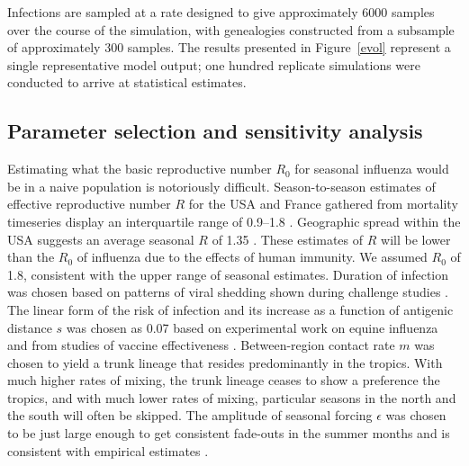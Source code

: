 \documentclass[11pt,oneside,letterpaper]{article}
\begin{document}
Infections are sampled at a rate designed to give approximately 6000 samples over the course of the simulation, with genealogies constructed from a subsample of approximately 300 samples.  The results presented in Figure~\ref{evol} represent a single representative model output; one hundred replicate simulations were conducted to arrive at statistical estimates. 

\subsection*{Parameter selection and sensitivity analysis}

Estimating what the basic reproductive number $R_0$ for seasonal influenza would be in a naive population is notoriously difficult.  Season-to-season estimates of effective reproductive number $R$ for the USA and France gathered from mortality timeseries display an interquartile range of 0.9--1.8 \cite{Chowell08}.  Geographic spread within the USA suggests an average seasonal $R$ of 1.35 \cite{Viboud06}.  These estimates of $R$ will be lower than the $R_0$ of influenza due to the effects of human immunity.  We assumed $R_0$ of 1.8, consistent with the upper range of seasonal estimates.  Duration of infection was chosen based on patterns of viral shedding shown during challenge studies \cite{Carrat08}.  The linear form of the risk of infection and its increase as a function of antigenic distance $s$ was chosen as 0.07 based on experimental work on equine influenza \cite{Park09} and from studies of vaccine effectiveness \cite{Gupta06}.  Between-region contact rate $m$ was chosen to yield a trunk lineage that resides predominantly in the tropics.  With much higher rates of mixing, the trunk lineage ceases to show a preference the tropics, and with much lower rates of mixing, particular seasons in the north and the south will often be skipped.  The amplitude of seasonal forcing $\epsilon$ was chosen to be just large enough to get consistent fade-outs in the summer months and is consistent with empirical estimates \cite{Truscott11}.
\end{document}
